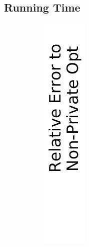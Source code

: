 \begin{table}[t]
\begin{tabular}{ccccccc}
  \end{tabular}
\end{table}

\subsection{Running Time}
\label{sec:running-time-in}

\begin{figure}[t]
  \captionsetup[subfigure]{justification=centering}
  \centering
  \begin{subfigure}{0.045\linewidth}
    \centering
    \includegraphics[width=\linewidth]{plots/xlegend.pdf}

\end{subfigure}
\end{figure}
